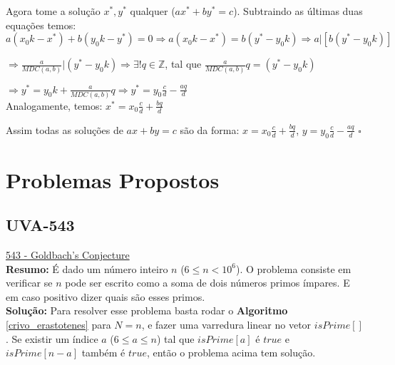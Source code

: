 Agora tome a solução $x^*,y^*$ qualquer ($ax^*+by^*=c$). Subtraindo as últimas duas equações temos:
\\

$a(x_0k-x^*) + b(y_0k-y^*) = 0 \Rightarrow a(x_0k-x^*) = b(y^* - y_0k) \Rightarrow a|[b(y^* - y_0k)]$

$\Rightarrow \frac{a}{MDC(a,b)}|(y^* - y_0k) \Rightarrow \exists! q\in\mathbb{Z}$, tal que $\frac{a}{MDC(a,b)}q = (y^* - y_0k)$

$\Rightarrow y^* = y_0k + \frac{a}{MDC(a,b)}q \Rightarrow y^* = y_0\frac{c}{d} - \frac{aq}{d}$
\\

Analogamente, temos: $x^* = x_0\frac{c}{d} + \frac{bq}{d}$

Assim todas as soluções de $ax+by=c$ são da forma:
$x = x_0\frac{c}{d} + \frac{bq}{d}$, $y = y_0\frac{c}{d} - \frac{aq}{d}$ $\square$
\\



\section{Problemas Propostos}



\subsection{UVA-543}
\href{https://uva.onlinejudge.org/index.php?option=onlinejudge&page=show_problem&problem=484}{543 - Goldbach's Conjecture}\\

\textbf{Resumo:} 
É dado um número inteiro $n$ ($6 \leq n < 10^6$). O problema consiste em verificar se $n$ pode ser escrito como a soma de dois números
primos ímpares. E em caso positivo dizer quais são esses primos.
\\

\textbf{Solução:}
Para resolver esse problema basta rodar o \textbf{Algoritmo} \autoref{crivo_erastotenes} para $N=n$, e fazer uma varredura linear no vetor $isPrime[]$. Se existir um índice $a$ ($6 \leq a \leq n$) tal que $isPrime[a]$ é $true$ e $isPrime[n-a]$ também é $true$, então o problema acima tem solução. 
\\

